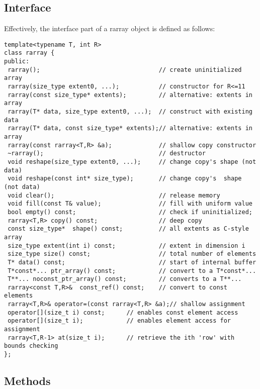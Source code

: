 \documentclass[11pt,twoside]{article}
\begin{document}
\subsection{Interface}
Effectively, the interface part of a rarray object is defined as follows:%
\vspace{-8pt}%
\begin{framed}\vspace{-14pt}%
\begin{verbatim}
template<typename T, int R>
class rarray {
public:    
 rarray();                                 // create uninitialized array
 rarray(size_type extent0, ...);           // constructor for R<=11
 rarray(const size_type* extents);         // alternative: extents in array
 rarray(T* data, size_type extent0, ...);  // construct with existing data
 rarray(T* data, const size_type* extents);// alternative: extents in array
 rarray(const rarray<T,R> &a);             // shallow copy constructor   
 ~rarray();                                // destructor 
 void reshape(size_type extent0, ...);     // change copy's shape (not data)
 void reshape(const int* size_type);       // change copy's  shape (not data)
 void clear();                             // release memory
 void fill(const T& value);                // fill with uniform value
 bool empty() const;                       // check if uninitialized;
 rarray<T,R> copy() const;                 // deep copy
 const size_type*  shape() const;          // all extents as C-style array
 size_type extent(int i) const;            // extent in dimension i
 size_type size() const;                   // total number of elements
 T* data() const;                          // start of internal buffer
 T*const*... ptr_array() const;            // convert to a T*const*... 
 T**... noconst_ptr_array() const;         // converts to a T**... 
 rarray<const T,R>&  const_ref() const;    // convert to const elements
 rarray<T,R>& operator=(const rarray<T,R> &a);// shallow assignment
 operator[](size_t i) const;      // enables const element access
 operator[](size_t i);            // enables element access for assignment
 rarray<T,R-1> at(size_t i);      // retrieve the ith 'row' with bounds checking
};
\end{verbatim}
\end{framed}



\subsection{Methods}
\end{document}
